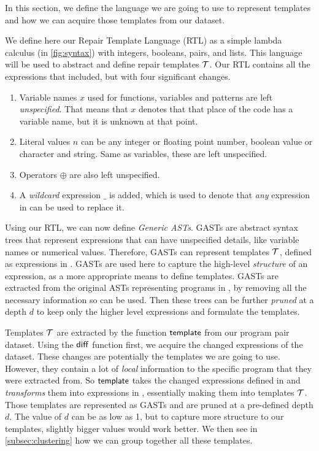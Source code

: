 In this section, we define the language we are going to use to represent
templates and how we can acquire those templates from our dataset.

We define here our Repair Template Language (RTL) as a simple lambda calculus
(\repairLang in \autoref{fig:syntax}) with integers, booleans, pairs, and lists.
This language will be used to abstract and define repair templates $\mathcal{T}$. Our RTL
contains all the expressions that \lang included, but with four significant
changes.

\begin{enumerate}
    \item Variable names $x$ used for functions, variables and patterns are left
    \emph{unspecified}. That means that $x$ denotes that that place of the code
    has a variable name, but it is unknown at that point.
    \item Literal values $n$ can be any integer or floating point number,
    boolean value or character and string. Same as variables, these are left
    unspecified.
    \item Operators $\oplus$ are also left unspecified.
    \item A \emph{wildcard} expression $\_$ is added, which is used to denote
    that \emph{any} expression in \repairLang can be used to replace it.
\end{enumerate}



Using our RTL, we can now define \emph{Generic ASTs}. GASTs are abstract syntax
trees that represent expressions that can have unspecified details, like
variable names or numerical values. Therefore, GASTs can represent templates
$\mathcal{T}$, defined as expressions in \repairLang. GASTs are used here to capture the
high-level \emph{structure} of an expression, as a more appropriate means to
define templates. GASTs are extracted from the original ASTs representing
programs in \lang, by removing all the necessary information so \repairLang can
be used. Then these trees can be further \emph{pruned} at a depth $d$ to keep
only the higher level expressions and formulate the templates.


Templates $\mathcal{T}$ are extracted by the function $\mathsf{template}$ from our program
pair dataset. Using the $\mathsf{diff}$ function first, we acquire the changed
expressions of the dataset. These changes are potentially the templates we are
going to use. However, they contain a lot of \emph{local} information to the
specific program that they were extracted from. So $\mathsf{template}$ takes the
changed expressions defined in \lang and \emph{transforms} them into expressions
in \repairLang, essentially making them into templates $\mathcal{T}$. Those templates are
represented as GASTs and are pruned at a pre-defined depth $d$. The value of $d$
can be as low as 1, but to capture more structure to our templates, slightly
bigger values would work better. We then see in \autoref{subsec:clustering} how
we can group together all these templates.

